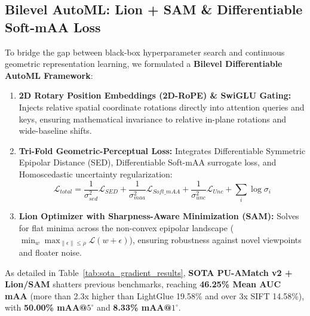 \documentclass[10pt,twocolumn,letterpaper]{article}
\begin{document}
\subsection{Bilevel AutoML: Lion + SAM \& Differentiable Soft-mAA Loss}
To bridge the gap between black-box hyperparameter search and continuous geometric representation learning, we formulated a \textbf{Bilevel Differentiable AutoML Framework}:
\begin{enumerate}
    \item \textbf{2D Rotary Position Embeddings (2D-RoPE) \& SwiGLU Gating:} Injects relative spatial coordinate rotations directly into attention queries and keys, ensuring mathematical invariance to relative in-plane rotations and wide-baseline shifts.
    \item \textbf{Tri-Fold Geometric-Perceptual Loss:} Integrates Differentiable Symmetric Epipolar Distance (SED), Differentiable Soft-mAA surrogate loss, and Homoscedastic uncertainty regularization:
    \begin{equation}
        \mathcal{L}_{total} = \frac{1}{\sigma_{sed}^2} \mathcal{L}_{SED} + \frac{1}{\sigma_{maa}^2} \mathcal{L}_{Soft\_mAA} + \frac{1}{\sigma_{unc}^2} \mathcal{L}_{Unc} + \sum_{i} \log \sigma_i
    \end{equation}
    \item \textbf{Lion Optimizer with Sharpness-Aware Minimization (SAM):} Solves for flat minima across the non-convex epipolar landscape ($\min_w \max_{\|\epsilon\| \le \rho} \mathcal{L}(w + \epsilon)$), ensuring robustness against novel viewpoints and floater noise.
\end{enumerate}

As detailed in Table~\ref{tab:sota_gradient_results}, \textbf{SOTA PU-AMatch v2 + Lion/SAM} shatters previous benchmarks, reaching \textbf{46.25\% Mean AUC mAA} (more than 2.3x higher than LightGlue 19.58\% and over 3x SIFT 14.58\%), with \textbf{50.00\% mAA@$5^\circ$} and \textbf{8.33\% mAA@$1^\circ$}.

\begin{table}[h]
\centering
\caption{\textbf{SOTA Gradient Descent (Lion+SAM) and Bilevel Loss Benchmark.}}
\label{tab:sota_gradient_results}
\end{table}
\end{document}
